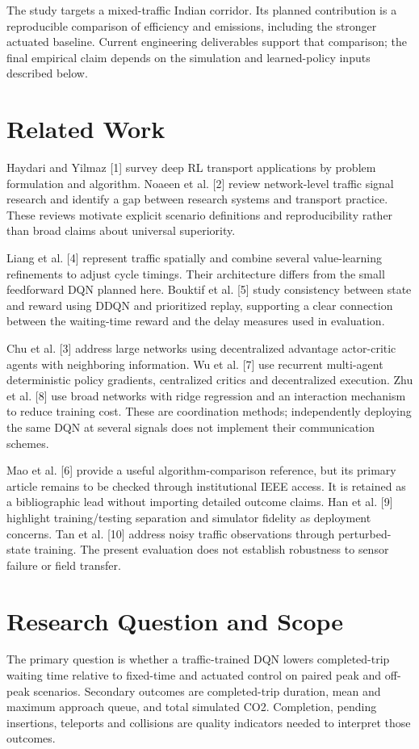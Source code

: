 \documentclass[conference]{IEEEtran}
\begin{document}
The study targets a mixed-traffic Indian corridor. Its planned contribution is a reproducible comparison of efficiency and emissions, including the stronger actuated baseline. Current engineering deliverables support that comparison; the final empirical claim depends on the simulation and learned-policy inputs described below.

\section{Related Work}
Haydari and Yilmaz [1] survey deep RL transport applications by problem formulation and algorithm. Noaeen et al. [2] review network-level traffic signal research and identify a gap between research systems and transport practice. These reviews motivate explicit scenario definitions and reproducibility rather than broad claims about universal superiority.

Liang et al. [4] represent traffic spatially and combine several value-learning refinements to adjust cycle timings. Their architecture differs from the small feedforward DQN planned here. Bouktif et al. [5] study consistency between state and reward using DDQN and prioritized replay, supporting a clear connection between the waiting-time reward and the delay measures used in evaluation.

Chu et al. [3] address large networks using decentralized advantage actor-critic agents with neighboring information. Wu et al. [7] use recurrent multi-agent deterministic policy gradients, centralized critics and decentralized execution. Zhu et al. [8] use broad networks with ridge regression and an interaction mechanism to reduce training cost. These are coordination methods; independently deploying the same DQN at several signals does not implement their communication schemes.

Mao et al. [6] provide a useful algorithm-comparison reference, but its primary article remains to be checked through institutional IEEE access. It is retained as a bibliographic lead without importing detailed outcome claims. Han et al. [9] highlight training/testing separation and simulator fidelity as deployment concerns. Tan et al. [10] address noisy traffic observations through perturbed-state training. The present evaluation does not establish robustness to sensor failure or field transfer.

\section{Research Question and Scope}
The primary question is whether a traffic-trained DQN lowers completed-trip waiting time relative to fixed-time and actuated control on paired peak and off-peak scenarios. Secondary outcomes are completed-trip duration, mean and maximum approach queue, and total simulated CO2. Completion, pending insertions, teleports and collisions are quality indicators needed to interpret those outcomes.
\end{document}
